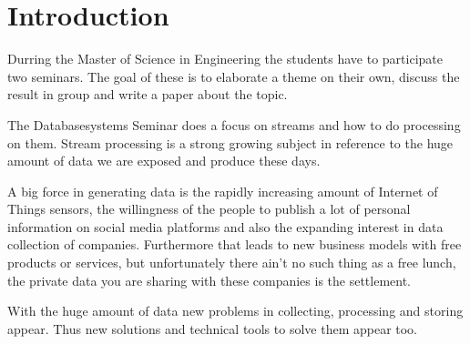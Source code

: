 \chapter{Introduction}
\label{introduction}

Durring the Master of Science in Engineering the students have to participate two seminars.
The goal of these is to elaborate a theme on their own, discuss the result in group and write a paper about the topic.

The Databasesystems Seminar does a focus on streams and how to do processing on them.
Stream processing is a strong growing subject in reference to the huge amount of data we are exposed and produce these days.

A big force in generating data is the rapidly increasing amount of Internet of Things sensors,
the willingness of the people to publish a lot of personal information on social media platforms and
also the expanding interest in data collection of companies.
Furthermore that leads to new business models with free products or services,
but unfortunately there ain't no such thing as a free lunch, the private data you are sharing with these companies is the settlement.

With the huge amount of data new problems in collecting, processing and storing appear.
Thus new solutions and technical tools to solve them appear too.
